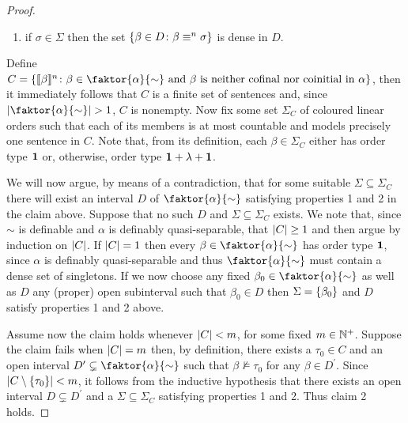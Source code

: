 \begin{proof}
\begin{claim}
\begin{enumerate}[nosep]
			\item if $\sigma\in\Sigma$ then the set $\left\lbrace \beta\in D\colon \beta\equiv^{n}\sigma \right\rbrace$ is dense in $D$.
		\end{enumerate}
	\end{claim}

	Define $C=\setbuild{\cha{\beta}{n}}{\beta\in\faktor{\alpha}{\sim}\text{ and }\beta\text{ is neither cofinal nor coinitial in }\alpha}$, then it immediately follows that $C$ is a finite set of sentences and, since $\card{\faktor{\alpha}{\sim}}>1$, $C$ is nonempty.  Now fix some set $\Sigma_C$ of coloured linear orders such that each of its members is at most countable and models precisely one sentence in $C$.  Note that, from its definition, each $\beta\in\Sigma_C$ either has order type $\mathbf{1}$ or, otherwise, order type $\mathbf{1}+\lambda+\mathbf{1}$.

	We will now argue, by means of a contradiction, that for some suitable $\Sigma\subseteq\Sigma_C$ there will exist an interval $D$ of $\faktor{\alpha}{\sim}$ satisfying properties 1 and 2 in the claim above.  Suppose that no such $D$ and $\Sigma\subseteq\Sigma_C$ exists.  We note that, since $\sim$ is definable and $\alpha$ is definably quasi-separable, that $\left\lvert C\right\rvert\geq 1$ and then argue by induction on $\left\lvert C\right\rvert$.  If $\left\lvert C\right\rvert=1$ then every $\beta\in\faktor{\alpha}{\sim}$ has order type $\mathbf{1}$, since $\alpha$ is definably quasi-separable and thus $\faktor{\alpha}{\sim}$ must contain a dense set of singletons.  If we now choose any fixed $\beta_0\in\faktor{\alpha}{\sim}$ as well as $D$ any (proper) open subinterval such that $\beta_0\in D$ then $\Sigma=\left\lbrace \beta_0\right\rbrace$ and $D$ satisfy properties 1 and 2 above.

	Assume now the claim holds whenever $\left\lvert C\right\rvert<m$, for some fixed $m\in\mathbb{N}^{+}$.  Suppose the claim fails when $\left\lvert C\right\rvert=m$ then, by definition, there exists a $\tau_0\in C$ and an open interval $D^\prime\subsetneq\faktor{\alpha}{\sim}$ such that $\beta\not\models\tau_0$ for any $\beta\in D^\prime$.  Since $\left\lvert C\setminus\left\lbrace \tau_0\right\rbrace\right\rvert<m$, it follows from the inductive hypothesis that there exists an open interval $D\subsetneq D^\prime$ and a $\Sigma\subseteq\Sigma_C$ satisfying properties 1 and 2.   Thus claim 2 holds.


\end{proof}
